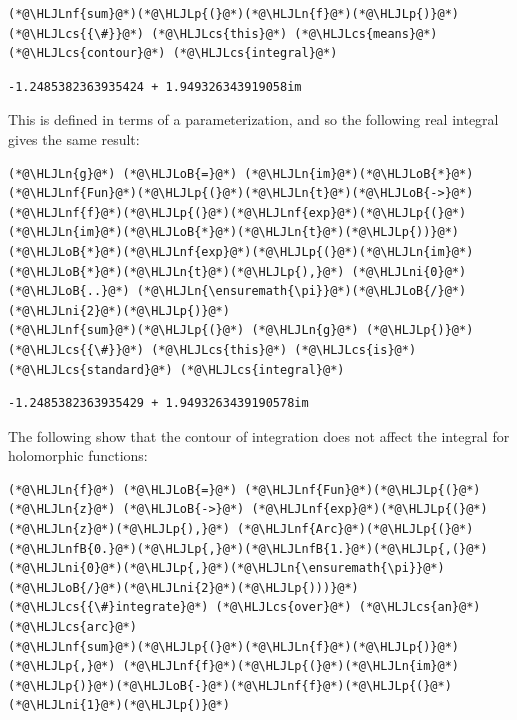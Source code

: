 \documentclass[12pt,a4paper]{article}
\newcommand{\HLJLn}[1]{#1}
\newcommand{\HLJLnf}[1]{\textcolor[RGB]{66,102,213}{#1}}
\newcommand{\HLJLnfB}[1]{\textcolor[RGB]{59,151,46}{#1}}
\newcommand{\HLJLni}[1]{\textcolor[RGB]{59,151,46}{#1}}
\newcommand{\HLJLoB}[1]{\textcolor[RGB]{102,102,102}{\textbf{#1}}}
\newcommand{\HLJLp}[1]{#1}
\newcommand{\HLJLcs}[1]{\textcolor[RGB]{153,153,119}{\textit{#1}}}
\begin{document}
\begin{lstlisting}
(*@\HLJLnf{sum}@*)(*@\HLJLp{(}@*)(*@\HLJLn{f}@*)(*@\HLJLp{)}@*)  (*@\HLJLcs{{\#}}@*) (*@\HLJLcs{this}@*) (*@\HLJLcs{means}@*) (*@\HLJLcs{contour}@*) (*@\HLJLcs{integral}@*)
\end{lstlisting}

\begin{lstlisting}
-1.2485382363935424 + 1.949326343919058im
\end{lstlisting}


This is defined in terms of a parameterization, and so the following real integral gives the same result:


\begin{lstlisting}
(*@\HLJLn{g}@*) (*@\HLJLoB{=}@*) (*@\HLJLn{im}@*)(*@\HLJLoB{*}@*)(*@\HLJLnf{Fun}@*)(*@\HLJLp{(}@*)(*@\HLJLn{t}@*)(*@\HLJLoB{->}@*) (*@\HLJLnf{f}@*)(*@\HLJLp{(}@*)(*@\HLJLnf{exp}@*)(*@\HLJLp{(}@*)(*@\HLJLn{im}@*)(*@\HLJLoB{*}@*)(*@\HLJLn{t}@*)(*@\HLJLp{))}@*)(*@\HLJLoB{*}@*)(*@\HLJLnf{exp}@*)(*@\HLJLp{(}@*)(*@\HLJLn{im}@*)(*@\HLJLoB{*}@*)(*@\HLJLn{t}@*)(*@\HLJLp{),}@*) (*@\HLJLni{0}@*) (*@\HLJLoB{..}@*) (*@\HLJLn{\ensuremath{\pi}}@*)(*@\HLJLoB{/}@*)(*@\HLJLni{2}@*)(*@\HLJLp{)}@*)
(*@\HLJLnf{sum}@*)(*@\HLJLp{(}@*) (*@\HLJLn{g}@*) (*@\HLJLp{)}@*)  (*@\HLJLcs{{\#}}@*) (*@\HLJLcs{this}@*) (*@\HLJLcs{is}@*) (*@\HLJLcs{standard}@*) (*@\HLJLcs{integral}@*)
\end{lstlisting}

\begin{lstlisting}
-1.2485382363935429 + 1.9493263439190578im
\end{lstlisting}


The following show that the contour of integration does not affect the integral for holomorphic functions:


\begin{lstlisting}
(*@\HLJLn{f}@*) (*@\HLJLoB{=}@*) (*@\HLJLnf{Fun}@*)(*@\HLJLp{(}@*) (*@\HLJLn{z}@*) (*@\HLJLoB{->}@*) (*@\HLJLnf{exp}@*)(*@\HLJLp{(}@*)(*@\HLJLn{z}@*)(*@\HLJLp{),}@*) (*@\HLJLnf{Arc}@*)(*@\HLJLp{(}@*)(*@\HLJLnfB{0.}@*)(*@\HLJLp{,}@*)(*@\HLJLnfB{1.}@*)(*@\HLJLp{,(}@*)(*@\HLJLni{0}@*)(*@\HLJLp{,}@*)(*@\HLJLn{\ensuremath{\pi}}@*)(*@\HLJLoB{/}@*)(*@\HLJLni{2}@*)(*@\HLJLp{)))}@*) (*@\HLJLcs{{\#}integrate}@*) (*@\HLJLcs{over}@*) (*@\HLJLcs{an}@*) (*@\HLJLcs{arc}@*)
(*@\HLJLnf{sum}@*)(*@\HLJLp{(}@*)(*@\HLJLn{f}@*)(*@\HLJLp{)}@*)  (*@\HLJLp{,}@*) (*@\HLJLnf{f}@*)(*@\HLJLp{(}@*)(*@\HLJLn{im}@*)(*@\HLJLp{)}@*)(*@\HLJLoB{-}@*)(*@\HLJLnf{f}@*)(*@\HLJLp{(}@*)(*@\HLJLni{1}@*)(*@\HLJLp{)}@*)
\end{lstlisting}
\end{document}
